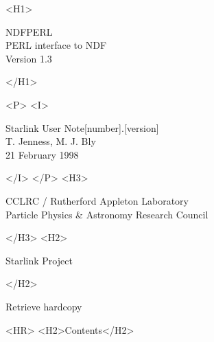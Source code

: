\documentclass[twoside,11pt]{article}
\newcommand{\stardoccategory}  {Starlink User Note}
\newcommand{\stardocsource}    {sun\stardocnumber}
\newcommand{\stardocnumber}    {[number].[version]}
\newcommand{\stardocauthors}   {T. Jenness, M. J. Bly}
\newcommand{\stardocdate}      {21 February 1998}
\newcommand{\stardoctitle}     {NDFPERL \\ [2ex] PERL interface to NDF}
\newcommand{\stardocversion}   {Version 1.3}
\newcommand{\stardocmanual}    {}
\newcommand{\htmladdnormallink}[2]{#1}
\newcommand{\htmladdimg}[1]{}
\newcommand{\htmlref}[2]{#1}
\newcommand{\htmladdtonavigation}[1]{}
\newcommand{\xlabel}[1]{}
\newcommand{\latexonlytoc}[0]{\tableofcontents}
\begin{document}
\begin{htmlonly}
   \xlabel{}
   \begin{rawhtml} <H1> \end{rawhtml}
      \stardoctitle\\
      \stardocversion\\
   \begin{rawhtml} </H1> \end{rawhtml}


   \begin{rawhtml} <P> <I> \end{rawhtml}
   \stardoccategory \stardocnumber \\
   \stardocauthors \\
   \stardocdate
   \begin{rawhtml} </I> </P> <H3> \end{rawhtml}
      \htmladdnormallink{CCLRC}{http://www.cclrc.ac.uk} /
      \htmladdnormallink{Rutherford Appleton Laboratory}
                        {http://www.cclrc.ac.uk/ral} \\
      \htmladdnormallink{Particle Physics \& Astronomy Research Council}
                        {http://www.pparc.ac.uk} \\
   \begin{rawhtml} </H3> <H2> \end{rawhtml}
      \htmladdnormallink{Starlink Project}{http://star-www.rl.ac.uk/}
   \begin{rawhtml} </H2> \end{rawhtml}
   \htmladdnormallink{\htmladdimg{source.gif} Retrieve hardcopy}
      {http://star-www.rl.ac.uk/cgi-bin/hcserver?\stardocsource}\\

  \label{stardoccontents}
  \begin{rawhtml} 
    <HR>
    <H2>Contents</H2>
  \end{rawhtml}
  \renewcommand{\latexonlytoc}[0]{}
  \htmladdtonavigation{\htmlref{\htmladdimg{contents_motif.gif}}
        {stardoccontents}}

\end{htmlonly}
\end{document}
